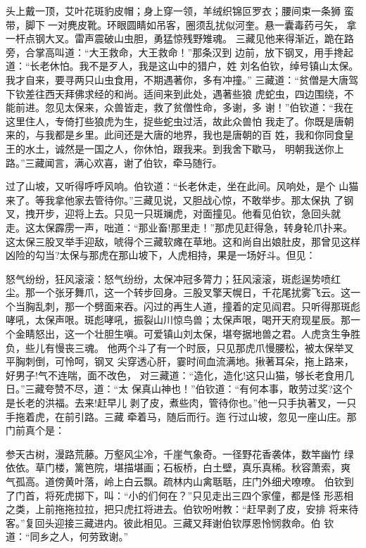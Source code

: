 头上戴一顶，艾叶花斑豹皮帽；身上穿一领，羊绒织锦叵罗衣；腰间束一条狮
蛮带，脚下一对麂皮靴。环眼圆睛如吊客，圈须乱扰似河奎。悬一囊毒药弓矢，
拿一杆点钢大叉。雷声震破山虫胆，勇猛惊残野雉魂。
三藏见他来得渐近，跪在路旁，合掌高叫道：“大王救命，大王救命！”那条汉到
边前，放下钢叉，用手搀起道：“长老休怕。我不是歹人，我是这山中的猎户，姓
刘名伯钦，绰号镇山太保。我才自来，要寻两只山虫食用，不期遇著你，多有冲撞。”
三藏道：“贫僧是大唐驾下钦差往西天拜佛求经的和尚。适间来到此处，遇著些狼
虎蛇虫，四边围绕，不能前进。忽见太保来，众兽皆走，救了贫僧性命，多谢，多
谢！”伯钦道：“我在这里住人，专倚打些狼虎为生，捉些蛇虫过活，故此众兽怕
我走了。你既是唐朝来的，与我都是乡里。此间还是大唐的地界，我也是唐朝的百
姓，我和你同食皇王的水土，诚然是一国之人，你休怕，跟我来。到我舍下歇马，
明朝我送你上路。”三藏闻言，满心欢喜，谢了伯钦，牵马随行。

过了山坡，又听得呼呼风响。伯钦道：“长老休走，坐在此间。风响处，是个
山猫来了。等我拿他家去管待你。”三藏见说，又胆战心惊，不敢举步。那太保执
了钢叉，拽开步，迎将上去。只见一只斑斓虎，对面撞见。他看见伯钦，急回头就
走。这太保霹雳一声，咄道：“那业畜!那里走！”那虎见赶得急，转身轮爪扑来。
这太保三股叉举手迎敌，唬得个三藏软瘫在草地。这和尚自出娘肚皮，那曾见这样
凶险的勾当?太保与那虎在那山坡下，人虎相持，果是一场好斗。但见：

怒气纷纷，狂风滚滚：怒气纷纷，太保冲冠多膂力；狂风滚滚，斑彪逞势喷红
尘。那一个张牙舞爪，这一个转步回身。三股叉擎天幌日，千花尾扰雾飞云。这一
个当胸乱刺，那一个劈面来吞。闪过的再生人道，撞着的定见阎君。只听得那斑彪
哮吼，太保声哏。斑彪哮吼，振裂山川惊鸟兽；太保声哏，喝开天府现星辰。那一
个金睛怒出，这一个壮胆生嗔。可爱镇山刘太保，堪夸据地兽之君。人虎贪生争胜
负，些儿有慢丧三魂。
他两个斗了有一个时辰，只见那虎爪慢腰松，被太保举叉平胸刺倒，可怜呵，钢叉
尖穿透心肝，霎时间血流满地。揪著耳朵，拖上路来，好男子!气不连喘，面不改色，
对三藏道：“造化，造化!这只山猫，够长老食用几日。”三藏夸赞不尽，道：“太
保真山神也！”伯钦道：“有何本事，敢劳过奖?这个是长老的洪福。去来!赶早儿
剥了皮，煮些肉，管待你也。”他一只手执著叉，一只手拖着虎，在前引路。三藏
牵着马，随后而行。迤行过山坡，忽见一座山庄。那门前真个是：

参天古树，漫路荒藤。万壑风尘冷，千崖气象奇。一径野花香袭体，数竿幽竹
绿依依。草门楼，篱笆院，堪描堪画；石板桥，白土壁，真乐真稀。秋容萧索，爽
气孤高。道傍黄叶落，岭上白云飘。疏林内山禽聒聒，庄门外细犬嘹嘹。
伯钦到了门首，将死虎掷下，叫：“小的们何在？”只见走出三四个家僮，都是怪
形恶相之类，上前拖拖拉拉，把只虎扛将进去。伯钦吩咐教：“赶早剥了皮，安排
将来待客。”复回头迎接三藏进内。彼此相见。三藏又拜谢伯钦厚恩怜悯救命。伯
钦道：“同乡之人，何劳致谢。”


